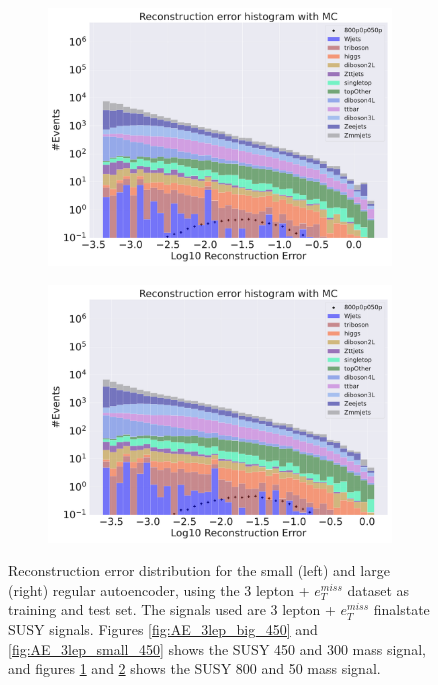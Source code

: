 \begin{figure}[H]
\begin{subfigure}{.45\textwidth}
        \includegraphics[width=\textwidth]{Figures/AE_testing/big/3lep/b_data_recon_big_rm3_feats_sig_800p0p050p.pdf}
        \caption{}
        \label{fig:AE_3lep_big_800}
    \end{subfigure}
    \hfill   
    \begin{subfigure}{.45\textwidth}
        \includegraphics[width=\textwidth]{Figures/AE_testing/small/3lep/b_data_recon_big_rm3_feats_sig_800p0p050p.pdf}
        \caption{}
        \label{fig:AE_3lep_small_800}
    \end{subfigure}
    \hfill      
    \caption[3lep reconstruction error with SUSY signals for AE]{Reconstruction error distribution for the small (left) and large (right)
    regular autoencoder, using the 3 lepton + $e_T^{miss}$ dataset as training and test set. The signals used are 3 lepton + $e_T^{miss}$ 
    finalstate SUSY signals. Figures \ref{fig:AE_3lep_big_450} and \ref{fig:AE_3lep_small_450} shows the SUSY 450 and 300 mass signal, 
    and figures \ref{fig:AE_3lep_big_800} and \ref{fig:AE_3lep_small_800} shows the SUSY 800 and 50 mass signal.}
    \label{fig:AE_3lep_recon_err_both_sig}
\end{figure}

